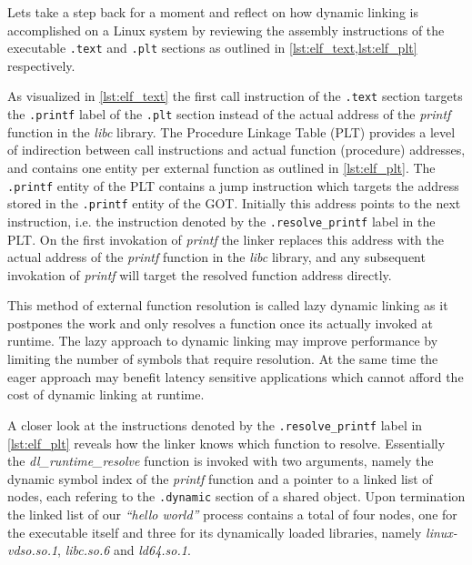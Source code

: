 Lets take a step back for a moment and reflect on how dynamic linking is accomplished on a Linux system by reviewing the assembly instructions of the executable \texttt{.text} and \texttt{.plt} sections as outlined in \cref{lst:elf_text,lst:elf_plt} respectively.





As visualized in \cref{lst:elf_text} the first call instruction of the \texttt{.text} section targets the \texttt{.printf} label of the \texttt{.plt} section instead of the actual address of the \textit{printf} function in the \textit{libc} library. The Procedure Linkage Table (PLT) provides a level of indirection between call instructions and actual function (procedure) addresses, and contains one entity per external function as outlined in \cref{lst:elf_plt}. The \texttt{.printf} entity of the PLT contains a jump instruction which targets the address stored in the \texttt{.printf} entity of the GOT. Initially this address points to the next instruction, i.e. the instruction denoted by the \texttt{.resolve\_printf} label in the PLT. On the first invokation of \textit{printf} the linker replaces this address with the actual address of the \textit{printf} function in the \textit{libc} library, and any subsequent invokation of \textit{printf} will target the resolved function address directly.

This method of external function resolution is called lazy dynamic linking as it postpones the work and only resolves a function once its actually invoked at runtime. The lazy approach to dynamic linking may improve performance by limiting the number of symbols that require resolution. At the same time the eager approach may benefit latency sensitive applications which cannot afford the cost of dynamic linking at runtime.

A closer look at the instructions denoted by the \texttt{.resolve\_printf} label in \cref{lst:elf_plt} reveals how the linker knows which function to resolve. Essentially the \textit{dl\_runtime\_resolve} function is invoked with two arguments, namely the dynamic symbol index of the \textit{printf} function and a pointer to a linked list of nodes, each refering to the \texttt{.dynamic} section of a shared object. Upon termination the linked list of our \textit{``hello world''} process contains a total of four nodes, one for the executable itself and three for its dynamically loaded libraries, namely \textit{linux-vdso.so.1}, \textit{libc.so.6} and \textit{ld64.so.1}.

